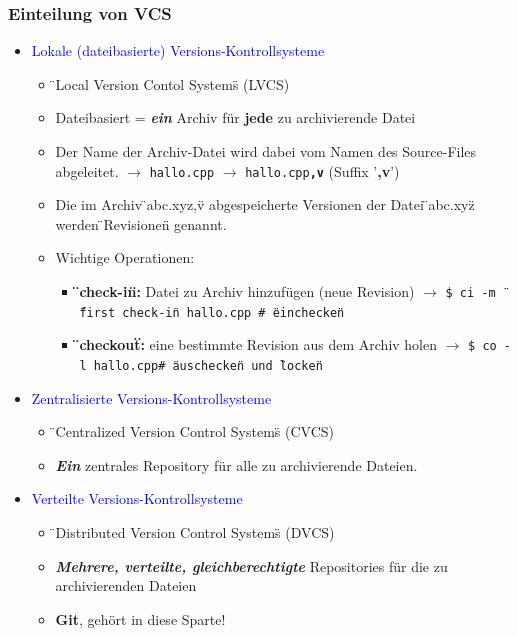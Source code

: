 \subsubsection{Einteilung von VCS}
	\begin{itemize}
\item \textcolor{blue}{Lokale (dateibasierte) Versions-Kontrollsysteme}
\begin{itemize}
\item \"{}Local Version Contol Systems\"{} (LVCS)
 \item Dateibasiert = \textbf{\textit{ein}} Archiv für \textbf{jede} zu archivierende Datei
 \item Der Name der Archiv-Datei wird dabei vom Namen des Source-Files abgeleitet. \newline $\rightarrow$ \texttt{hallo.cpp} $\rightarrow$ \texttt{hallo.cpp\textbf{,v}} (Suffix '\textbf{,v}') 
 \item Die im Archiv \"{}abc.xyz,v\"{} abgespeicherte Versionen der Datei \"{}abc.xyz\"{} werden \"{}Revisionen\"{} genannt.
 \item Wichtige Operationen:
 \begin{itemize}
 	\item \textbf{\"{}check-in\"{}:} Datei zu Archiv hinzufügen (neue Revision) \newline $\rightarrow$ \texttt{\$ ci -m \"{}first check-in\"{} hallo.cpp \qquad \# \"{}einchecken\"{}}
 	\item \textbf{\"{}checkout\"{}:} eine bestimmte Revision aus dem Archiv holen \newline $\rightarrow$ \texttt{\$ co -l hallo.cpp\qquad \# \"{}auschecken\"{} und \"{}locken\"{}}
 \end{itemize}
\end{itemize}
\item \textcolor{blue}{Zentralisierte Versions-Kontrollsysteme}
\begin{itemize}
	\item \"{}Centralized Version Control Systems\"{} (CVCS)
	\item \textbf{\textit{Ein}} zentrales Repository für alle zu archivierende Dateien. 
\end{itemize}
\item \textcolor{blue}{Verteilte Versions-Kontrollsysteme}
\begin{itemize}
	\item \"{}Distributed Version Control Systems\"{} (DVCS)
	\item \textbf{\textit{Mehrere, verteilte, gleichberechtigte}} Repositories für die zu archivierenden Dateien
	\item \textbf{Git}, gehört in diese Sparte!
\end{itemize}
\end{itemize}
\clearpage
